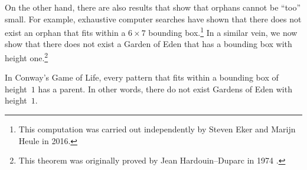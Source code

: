 On the other hand, there are also results that show that orphans cannot be ``too'' small. For example, exhaustive computer searches have shown that there does not exist an orphan that fits within a $6 \times 7$ bounding box.\footnote{This computation was carried out independently by Steven Eker and Marijn Heule in 2016.} In a similar vein, we now show that there does not exist a Garden of Eden that has a bounding box with height one.\footnote{This theorem was originally proved by Jean Hardouin--Duparc in 1974 \cite{Har74}.}

\begin{theorem}\label{thm:1_row_goe}
	In Conway's Game of Life, every pattern that fits within a bounding box of height~$1$ has a parent. In other words, there do not exist Gardens of Eden with height~$1$.
\end{theorem}

